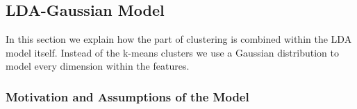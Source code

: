 \documentclass[a4paper,fleqn]{article}
\begin{document}
% 
%  
% 
% 

\subsection{LDA-Gaussian Model}
In this section we explain how the part of clustering is combined within the LDA model itself. Instead of the k-means clusters we use a Gaussian distribution to model every dimension within the features.


\subsubsection{Motivation and Assumptions of the Model}
 
\end{document}
